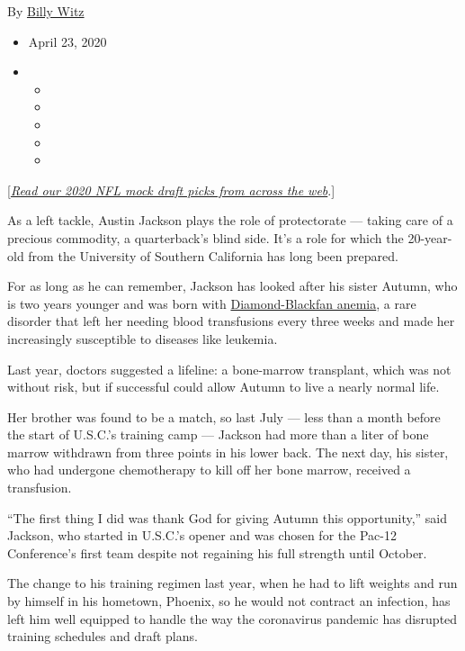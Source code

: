By \href{https://www.nytimes3xbfgragh.onion/by/billy-witz}{Billy Witz}

\begin{itemize}
\item
  April 23, 2020
\item
  \begin{itemize}
  \item
  \item
  \item
  \item
  \item
  \end{itemize}
\end{itemize}

{[}\href{https://www.nytimes3xbfgragh.onion/article/nfl-mock-draft-predictions.html}{\emph{Read
our 2020 NFL mock draft picks from across the web}}.{]}

As a left tackle, Austin Jackson plays the role of protectorate ---
taking care of a precious commodity, a quarterback's blind side. It's a
role for which the 20-year-old from the University of Southern
California has long been prepared.

For as long as he can remember, Jackson has looked after his sister
Autumn, who is two years younger and was born with
\href{https://ghr.nlm.nih.gov/condition/diamond-blackfan-anemia}{Diamond-Blackfan
anemia}, a rare disorder that left her needing blood transfusions every
three weeks and made her increasingly susceptible to diseases like
leukemia.

Last year, doctors suggested a lifeline: a bone-marrow transplant, which
was not without risk, but if successful could allow Autumn to live a
nearly normal life.

Her brother was found to be a match, so last July --- less than a month
before the start of U.S.C.'s training camp --- Jackson had more than a
liter of bone marrow withdrawn from three points in his lower back. The
next day, his sister, who had undergone chemotherapy to kill off her
bone marrow, received a transfusion.

``The first thing I did was thank God for giving Autumn this
opportunity,'' said Jackson, who started in U.S.C.'s opener and was
chosen for the Pac-12 Conference's first team despite not regaining his
full strength until October.

The change to his training regimen last year, when he had to lift
weights and run by himself in his hometown, Phoenix, so he would not
contract an infection, has left him well equipped to handle the way the
coronavirus pandemic has disrupted training schedules and draft plans.

